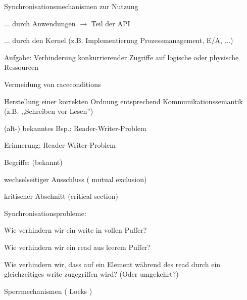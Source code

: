 \documentclass[a4paper]{article}
\begin{document}
\begin{multicols}{3}
    \begin{itemize*}
        \item Synchronisationsmechanismen zur Nutzung
        \begin{itemize*}
            \item ... durch Anwendungen $\rightarrow$ Teil der API
            \item ... durch den Kernel (z.B. Implementierung Prozessmanagement, E/A, ...)
        \end{itemize*}
        \item Aufgabe: Verhinderung konkurrierender Zugriffe auf logische oder
        physische Ressourcen
        \begin{itemize*}
            \item Vermeidung von raceconditions
            \item Herstellung einer korrekten Ordnung entsprechend Kommunikationssemantik (z.B. ,,Schreiben vor Lesen'')
        \end{itemize*}
        \item (alt-) bekanntes Bsp.: Reader-Writer-Problem
    \end{itemize*}

    Erinnerung: Reader-Writer-Problem

    \begin{itemize*}
        \item Begriffe: (bekannt)
        \begin{itemize*}
            \item wechselseitiger Ausschluss ( mutual exclusion)
            \item kritischer Abschnitt (critical section)
        \end{itemize*}
        \item Synchronisationsprobleme:
        \begin{itemize*}
            \item Wie verhindern wir ein write in vollen Puffer?
            \item Wie verhindern wir ein read aus leerem Puffer?
            \item Wie verhindern wir, dass auf ein Element während des read durch ein gleichzeitiges write zugegriffen wird? (Oder umgekehrt?)
        \end{itemize*}
    \end{itemize*}

    Sperrmechanismen ( Locks )


\end{multicols}
\end{document}
